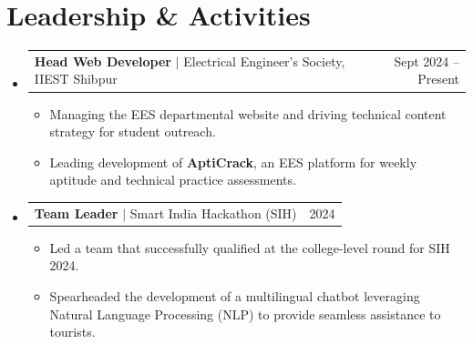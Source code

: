 \documentclass[letterpaper,11pt]{article}
\makeatletter
\newcommand{\resumeItem}[1]{
  \item\small{
    {#1 \vspace{-2pt}}
  }
}
\newcommand{\resumeProjectHeading}[2]{
    \item
    \begin{tabular*}{0.97\textwidth}{l@{\extracolsep{\fill}}r}
      \small#1 & #2 \\
    \end{tabular*}\vspace{-7pt}
}
\newcommand{\resumeSubHeadingListStart}{\begin{itemize}[leftmargin=0.15in, label={}]}
\newcommand{\resumeSubHeadingListEnd}{\end{itemize}}
\newcommand{\resumeItemListStart}{\begin{itemize}}
\newcommand{\resumeItemListEnd}{\end{itemize}\vspace{-5pt}}
\makeatother
\begin{document}
\section{Leadership \& Activities}
  \resumeSubHeadingListStart

    \resumeProjectHeading
      {\textbf{Head Web Developer} $|$ Electrical Engineer's Society, IIEST Shibpur}{Sept 2024 -- Present}
      \resumeItemListStart
        \resumeItem{Managing the EES departmental website and driving technical content strategy for student outreach.}
        \resumeItem{Leading development of \textbf{AptiCrack}, an EES platform for weekly aptitude and technical practice assessments.}
      \resumeItemListEnd

    \resumeProjectHeading
      {\textbf{Team Leader} $|$ Smart India Hackathon (SIH)}{2024}
      \resumeItemListStart
        \resumeItem{Led a team that successfully qualified at the college-level round for SIH 2024.}
        \resumeItem{Spearheaded the development of a multilingual chatbot leveraging Natural Language Processing (NLP) to provide seamless assistance to tourists.}
      \resumeItemListEnd

  \resumeSubHeadingListEnd


\end{document}
